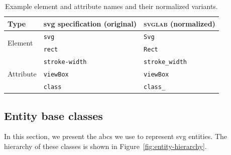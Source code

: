 \begin{table}[H]
    \centering
    \begin{tabular}{lll}
        \toprule
        \textbf{Type} & \textbf{\gls{svg} specification} (original) & \textbf{\textsc{svglab}} (normalized) \\
        \midrule
        \multirow{2}{*}{\centering Element} & \texttt{svg} & \texttt{Svg} \\
                & \texttt{rect} & \texttt{Rect} \\
        \midrule
        \multirow{3}{*}{\centering Attribute} & \texttt{stroke-width} & \texttt{stroke\_width} \\
                  & \texttt{viewBox} & \texttt{viewBox} \\
                  & \texttt{class} & \texttt{class\_} \\
        \bottomrule
    \end{tabular}
    \caption{Example element and attribute names and their normalized variants.}
    \label{tab:name-normalization}
\end{table}

\subsection{Entity base classes}\label{impl:representation:abcs}

In this section, we present the \glspl{abc} we use to represent \gls{svg} entities. The hierarchy of these classes is shown in Figure~\ref{fig:entity-hierarchy}.

